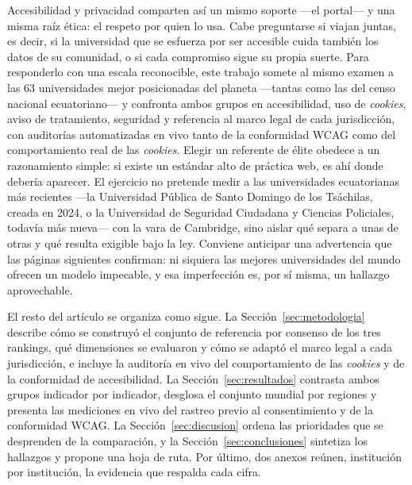 \documentclass[11pt,a4paper]{article}
\begin{document}
Accesibilidad y privacidad comparten así un mismo soporte ---el portal--- y una misma raíz ética: el respeto por quien lo usa. Cabe preguntarse si viajan juntas, es decir, si la universidad que se esfuerza por ser accesible cuida también los datos de su comunidad, o si cada compromiso sigue su propia suerte. Para responderlo con una escala reconocible, este trabajo somete al mismo examen a las 63 universidades mejor posicionadas del planeta ---tantas como las del censo nacional ecuatoriano--- y confronta ambos grupos en accesibilidad, uso de \emph{cookies}, aviso de tratamiento, seguridad y referencia al marco legal de cada jurisdicción, con auditorías automatizadas en vivo tanto de la conformidad WCAG como del comportamiento real de las \emph{cookies}. Elegir un referente de élite obedece a un razonamiento simple: si existe un estándar alto de práctica web, es ahí donde debería aparecer. El ejercicio no pretende medir a las universidades ecuatorianas más recientes ---la Universidad Pública de Santo Domingo de los Tsáchilas, creada en 2024, o la Universidad de Seguridad Ciudadana y Ciencias Policiales, todavía más nueva--- con la vara de Cambridge, sino aislar qué separa a unas de otras y qué resulta exigible bajo la ley. Conviene anticipar una advertencia que las páginas siguientes confirman: ni siquiera las mejores universidades del mundo ofrecen un modelo impecable, y esa imperfección es, por sí misma, un hallazgo aprovechable.

El resto del artículo se organiza como sigue. La Sección~\ref{sec:metodologia} describe cómo se construyó el conjunto de referencia por consenso de los tres rankings, qué dimensiones se evaluaron y cómo se adaptó el marco legal a cada jurisdicción, e incluye la auditoría en vivo del comportamiento de las \emph{cookies} y de la conformidad de accesibilidad. La Sección~\ref{sec:resultados} contrasta ambos grupos indicador por indicador, desglosa el conjunto mundial por regiones y presenta las mediciones en vivo del rastreo previo al consentimiento y de la conformidad WCAG. La Sección~\ref{sec:discusion} ordena las prioridades que se desprenden de la comparación, y la Sección~\ref{sec:conclusiones} sintetiza los hallazgos y propone una hoja de ruta. Por último, dos anexos reúnen, institución por institución, la evidencia que respalda cada cifra.
\end{document}

